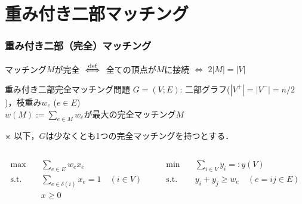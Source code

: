 \documentclass[14pt,aspectratio=169,xcolor=dvipsnames,table,onlytextwidth,dvipdfmx]{beamer}
\begin{document}
\section{重み付き二部マッチング}
\begin{frame}
    \frametitle{重み付き二部（完全）マッチング}
    \small

    マッチング$M$が\alert{完全} $\overset{\text{def}}{\iff}$ 全ての頂点が$M$に接続 $\iff$ $2|M| = |V|$

    \begin{block}{重み付き二部完全マッチング問題}
         $G=(V; E)$: 二部グラフ($|V^+|=|V^-|=n/2$)，枝重み$w_e$ ($e \in E$) \\
         $w(M) := \sum_{e\in M}w_e$が最大の完全マッチング$M$
    \end{block}
    ※ 以下，$G$は少なくとも1つの完全マッチングを持つとする．
    \pause

    \begin{columns}[T]
    \begin{column}{.45\textwidth}
    \begin{primal}
        \setlength{\abovedisplayskip}{0pt}
        \begin{alignat*}{2}
            \text{max} & \quad  \sum_{e \in E} w_e x_e \\
            \text{s.t.} & \quad \sum_{e \in \delta(i)} x_e = 1  \quad (i \in V) \\
            & \quad x \geq 0 
        \end{alignat*}
    \end{primal}
    \end{column}
    \begin{column}{.45\textwidth}
    \begin{dual}
        \setlength{\abovedisplayskip}{0pt}
        \begin{alignat*}{2}
            \text{min} & \quad  \sum_{i \in V} y_i =: y(V) \\
            \text{s.t.} & \quad y_i + y_j \geq w_e \quad (e=ij \in E) 
        \end{alignat*}
    \end{dual}
    \end{column}
    \end{columns}

\end{frame}
\end{document}
